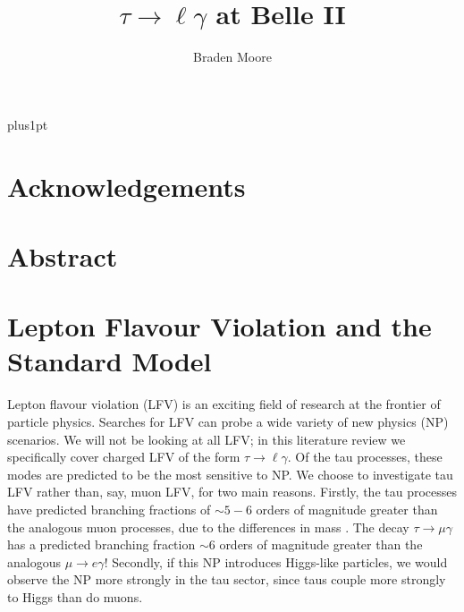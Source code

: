 \documentclass[12pt]{thesis}  %
\title{$\tau\to\ell\gamma$ at Belle II }   %
\author{Braden Moore}             %
\newcommand{\tmg}{\tau\to\mu\gamma}
\newcommand{\tlg}{\tau\to\ell\gamma}
\begin{document}
\baselineskip=18pt plus1pt

\setcounter{secnumdepth}{3}
\setcounter{tocdepth}{3}

\pagestyle{empty}
\maketitle                  %


\pagestyle{plain}
\begin{romanpages}
\tableofcontents

\chapter*{Acknowledgements}


\chapter*{Abstract}

\end{romanpages}


\chapter{Lepton Flavour Violation and the Standard Model}

Lepton flavour violation (LFV) is an exciting field of research at the frontier of particle physics. Searches for LFV can probe a wide variety of new physics (NP) scenarios. We will not be looking at all LFV; in this literature review we specifically cover charged LFV of the form $\tlg$. Of the tau processes, these modes are predicted to be the most sensitive to NP. We choose to investigate tau LFV rather than, say, muon LFV, for two main reasons. Firstly, the tau processes have predicted branching fractions of $\sim 5 - 6$ orders of magnitude greater than the analogous muon processes, due to the differences in mass \cite{Paradisi:2016}. The decay $\tmg$ has a predicted branching fraction $\sim 6$ orders of magnitude greater than the analogous $\mu\to e \gamma$! Secondly, if this NP introduces Higgs-like particles, we would observe the NP more strongly in the tau sector, since taus couple more strongly to Higgs than do muons.
\end{document}
